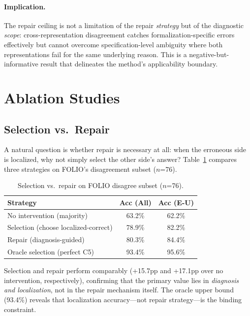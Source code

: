 \documentclass[11pt,a4paper]{article}
\begin{document}
\paragraph{Implication.} The repair ceiling is not a limitation of the repair \emph{strategy} but of the diagnostic \emph{scope}: cross-representation disagreement catches formalization-specific errors effectively but cannot overcome specification-level ambiguity where both representations fail for the same underlying reason. This is a negative-but-informative result that delineates the method's applicability boundary.

\section{Ablation Studies}
\label{sec:ablations}

\subsection{Selection vs.\ Repair}
\label{sec:selection}

A natural question is whether repair is necessary at all: when the erroneous side is localized, why not simply select the other side's answer? Table~\ref{tab:selection} compares three strategies on FOLIO's disagreement subset ($n$=76).

\begin{table}[t]
\centering
\small
\caption{Selection vs.\ repair on FOLIO disagree subset ($n$=76).}
\label{tab:selection}
\begin{tabular}{lcc}
\toprule
\textbf{Strategy} & \textbf{Acc (All)} & \textbf{Acc (E-U)} \\
\midrule
No intervention (majority) & 63.2\% & 62.2\% \\
Selection (choose localized-correct) & 78.9\% & 82.2\% \\
Repair (diagnosis-guided) & 80.3\% & 84.4\% \\
Oracle selection (perfect C5) & 93.4\% & 95.6\% \\
\bottomrule
\end{tabular}
\end{table}

Selection and repair perform comparably (+15.7pp and +17.1pp over no intervention, respectively), confirming that the primary value lies in \emph{diagnosis and localization}, not in the repair mechanism itself. The oracle upper bound (93.4\%) reveals that localization accuracy---not repair strategy---is the binding constraint.
\end{document}
